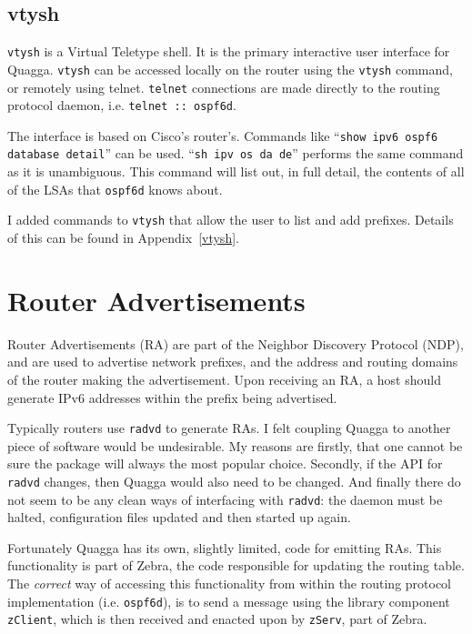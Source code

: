 \documentclass[12pt,a4paper,twoside]{report}
\begin{document}
\subsection{vtysh}
\texttt{vtysh}  is a
Virtual Teletype shell. It is the primary interactive user interface for
Quagga. \texttt{vtysh} can be accessed locally on the router using the
\texttt{vtysh} command, or remotely using telnet. \texttt{telnet} connections
are made directly to the routing protocol daemon, i.e. \texttt{telnet ::
ospf6d}.  

The interface is based on Cisco's router's. Commands like ``\texttt{show ipv6
ospf6 database detail}'' can be used. ``\texttt{sh ipv os da de}''  
performs the same command as it is unambiguous. This command will
list out, in full detail, the contents of all of the LSAs that \texttt{ospf6d}
knows about. 

I added commands to \texttt{vtysh} that allow the user to list and add
prefixes. Details of this can be found in Appendix~\ref{vtysh}. 

\section{Router Advertisements}
Router Advertisements (RA)  are part of
the Neighbor Discovery Protocol (NDP),  and are used to advertise network prefixes, and the address and
routing domains of the router making the advertisement. Upon receiving
an RA, a host should generate IPv6 addresses within the prefix being advertised. 

Typically routers use \texttt{radvd}  to generate RAs. I felt coupling Quagga to another
piece of software would be undesirable. My reasons are firstly, that one cannot
be sure the package will always the most popular choice. Secondly, if the
API for \texttt{radvd} changes, then Quagga would also need to be changed. And
finally there do not seem to be any clean ways of interfacing with
\texttt{radvd}: the daemon must be halted, configuration files updated and then
started up again.

Fortunately Quagga has its own, slightly limited, code for emitting RAs. This
functionality is part of Zebra, the code responsible for updating the routing
table. The \emph{correct} way of accessing this functionality from within the
routing protocol implementation (i.e. \texttt{ospf6d}), is to send a message
using the library component \texttt{zClient}, which is then received and
enacted upon by \texttt{zServ}, part of Zebra. 
\end{document}
